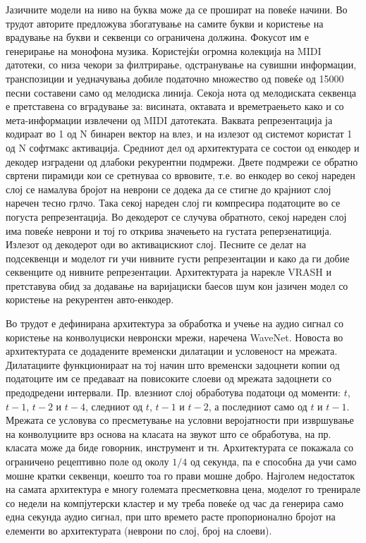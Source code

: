 Јазичните модели на ниво на буква може да се прошират на повеќе начини. Во трудот \cite{Tikhonov2017} авторите предложува збогатување на самите букви и користење на  врадување на букви и секвенци со ограничена должина. Фокусот им е генерирање на монофона музика. Користејќи огромна колекција на MIDI датотеки, со низа чекори за филтрирање, одстранување на сувишни информации, транспозиции и уедначувања добиле податочно множество од повеќе од 15000 песни составени само од мелодиска линија. Секоја нота од мелодиската секвенца е претставена со вградување за: висината, октавата и времетраењето како и со мета-информации извлечени од MIDI датотеката. Ваквата репрезентација ја кодираат во 1 од N бинарен вектор на влез, и на излезот од системот користат 1 од N софтмакс активација. Средниот дел од архитектурата се состои од енкодер и декодер изградени од длабоки рекурентни подмрежи. Двете подмрежи се обратно свртени пирамиди кои се сретнуваа со врвовите, т.е. во енкодер во секој нареден слој се намалува бројот на неврони се додека да се стигне до крајниот слој наречен тесно грлчо. Така секој нареден слој ги компресира податоците во се погуста репрезентација. Во декодерот се случува обратното, секој нареден слој има повеќе неврони и тој го открива значењето на густата реперзенатиција. Излезот од декодерот оди во активацискиот слој. Песните се делат на подсеквенци и моделот ги учи нивните густи репрезентации и како да ги добие секвенците од нивните репрезентации. Архитектурата ја нарекле VRASH и претставува обид за додавање на варијациски баесов шум кон јазичен модел со користење на рекурентен авто-енкодер.

Во трудот \cite{Oord2016} е дефинирана архитектура за обработка и учење на аудио сигнал со користење на конволуциски невронски мрежи, наречена WaveNet. Новоста во архитектурата се додадените временски дилатации и условеност на мрежата. Дилатациите функционираат на тој начин што временски задоцнети копии од податоците им се предаваат на повисоките слоеви од мрежата задоцнети со предодредени интервали. Пр. влезниот слој обработува податоци од моменти: $t$, $t-1$, $t-2$ и $t-4$, следниот од $t$, $t-1$ и $t-2$, а последниот само од $t$ и $t-1$. Мрежата се условува со пресметување на условни веројатности при извршување на конволуциите врз основа на класата на звукот што се обработува, на пр. класата може да биде говорник, инструмент и тн. Архитектурата се покажала со ограничено рецептивно поле од околу $1/4$ од секунда, па е способна да учи само мошне кратки секвенци, коешто тоа го прави мошне добро. Најголем недостаток на самата архитектура е многу големата пресметковна цена, моделот го тренирале со недели на компјутерски кластер и му треба повеќе од час да генерира само една секунда аудио сигнал, при што времето расте пропорионално бројот на елементи во архитектурата (неврони по слој, број на слоеви).

